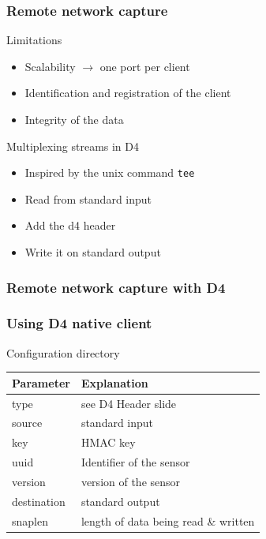 \documentclass{beamer}
\begin{document}
\begin{frame}
    \frametitle{Remote network capture}
    \begin{block}{Limitations}
        \begin{itemize}
            \item Scalability $\to$ one port per client
            \item Identification and registration of the client
            \item Integrity of the data
        \end{itemize}
    \end{block}

    \begin{block}{Multiplexing streams in D4}
        \begin{itemize}
            \item Inspired by the unix command {\tt tee}
            \item Read from standard input
            \item Add the d4 header
            \item Write it on standard output
        \end{itemize}
    \end{block}
\end{frame}


\begin{frame}
    \frametitle{Remote network capture with D4}
    \frametitle{Using D4 native client}
    

\begin{block}{Configuration directory}
    \begin{tabular}{l|l}
        Parameter & Explanation\\
        \hline
        type & see D4 Header slide\\
        source & standard input\\
        key & HMAC key\\
        uuid & Identifier of the sensor\\
        version &  version of the sensor\\
        destination & standard output\\
        snaplen & length of data being read \& written\\
    \end{tabular}
\end{block}
\end{frame}
\end{document}
